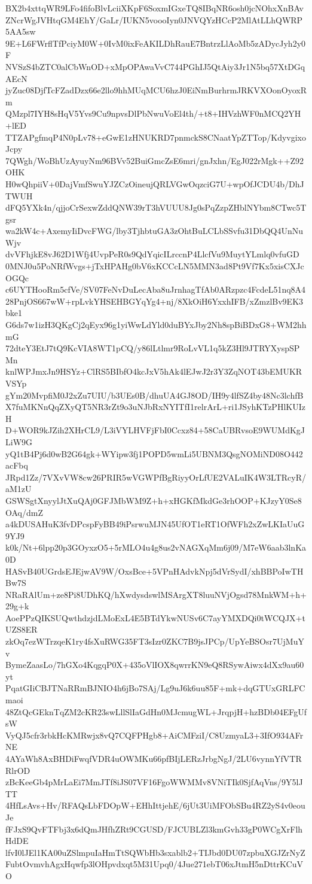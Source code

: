 BX2b4xttqWR9LFo4fifoBlvLciiXKpF6SoxmIGxeTQ8IBqNR6osh0jcNOhxXnBAv
ZNcrWgJVHtqGM4EhY/GaLr/IUKN5voooIyn0JNVQYzHCcP2MlAtLLhQWRP5AA5sw
9E+L6FWrflTfPciyM0W+0IvM0ixFeAKILDhRauE7BntrzLlAoMb5zADycJyh2y0F
NVSzS4bZTC0alCbWnOD+xMpOPAwaVvC744PGhIJ5QtAiy3Jr1N5bq57XtDGqAEcN
jyZuc08DjfTcFZadDzx66e2llo9hhMUqMCU6hzJ0EiNmBurhrmJRKVXOonOyoxRm
QMzpl7IYH8sHqV5Yvs9Cu9npvsDlPbNwuVoEl4th/+t8+IHVzhWF0nMCQ2YH+lED
TTZAPgfmqP4N0pLv78+eGwE1zHNUKRD7pnmckS8CNaatYpZTTop/KdyvgixoJcpy
7QWgh/WoBhUzAyuyNm96BVv52BuiGmcZsE6mri/gnJxhn/EgJ022rMgk++Z92OHK
H0wQhpiiV+0DajVmfSwuYJZCzOineujQRLVGwOqzciG7U+wpOfJCDU4b/DhJTWUH
dFQ5YXk4n/qjjoCrSexwZddQNW39rT3hVUUU8Jg0sPqZzpZHblNYbm8CTwc5Tgsr
wa2kW4c+AxemyIiDvcFWG/lby3TjhbtuGA3zOhtBuLCLbSSvfu31DbQQ4UnNuWjv
dvVFhjkE8vJ62D1Wfj4UvpPeR0s9QdYqicILrccnP4LlcfVu9MuytYLmlq0vfuGD
0MNJ0u5PoNRfWvgs+jTxHPAHg0bV6xKCCcLN5MMN3ad8Pt9Vf7Kx5xisCXJcOGQc
c6UYTHooRm5cfVe/SV07FeNvDuLecAba8uJrnhagTfAb0ARzpzc4FcdeL51nq8A4
28PnjOS667wW+rpLvkYHSEHBGYqYg4+nj/8XkOiH6YxxhIFB/xZmzlBv9EK3bke1
G6ds7w1izH3QKgCj2qEyx96g1yiWwLdYld0duBYxJby2Nh8spBiBDxG8+WM2hhmG
72dteY3EtJ7tQ9KcVIA8WT1pCQ/y86lLtlmr9RoLvVL1q5kZ3Hl9JTRYXyspSPMn
knlWPJmxJn9HSYz+ClRS5BIbfO4kcJxV5hAk4lEJwJ2r3Y3ZqNOT43bEMUKRVSYp
gYm20MvpfiM0J2xZu7UIU/b3UEs0B/dhuUA4GJ8OD/IH9y4lfSZ4by48Nc3lchfB
X7fuMKNnQqZXyQT5NR3rZt9o3uNJbRxNYITfI1relrArL+ri1JSyhKTzPHlKUIzH
D+WOR9kJZih2XHrCL9/L3iVYLHVFjFbI0Ccxz84+58CaUBRvsoE9WUMdKgJLiW9G
yQ1tB4Pj6d0wB2G64gk+WYipw3fj1POPD5wmLi5UBNM3QsgNOMiND08O442acFbq
JRpd1Zz/7VXvVW8cw26PRIR5wVGWPfBgRiyyOrLfUE2VALuIK4W3LTRcyR/aM1zU
GSWSgtXnyylJtXuQAj0GFJMbWM9Z+h+xHGKfMkdGe3rhOOP+KJzyY0Se8OAq/dmZ
a4kDUSAHuK3fvDPcspFyBB49iPsrwuMJN45UfOT1eRT1OfWFh2xZwLKIaUuG9YJ9
k0k/Nt+6lpp20p3GOyxzO5+5rMLO4u4g8us2vNAGXqMm6j09/M7eW6aab3lnKa0D
HASvB40UGrdsEJEjwAV9W/OxsBce+5VPnHAdvkNpj5dVrSydI/xhBBPoIwTHBw7S
NRaRAlUm+ze8Pi8UDhKQ/hXwdysdswlMSArgXT8luuNVjOgsd78MnkWM+h+29g+k
AoePPzQIKSUQwthdzjdLMoExL4E5BTdYkwNUSv6C7ayYMXDQi0tWCQJX+tUZS8ER
zkOq7ezWTrzqeK1ry4fsXuRWG35FT3sIzr0ZKC7B9jsJPCp/UpYeBSOsr7UjMuYv
BymeZaasLo/7hGXo4KqgqP0X+435oVlIOX8qwrrKN9eQ8RSywAiwx4dXx9au60yt
PqatGIiCBJTNaRRmBJNIO4h6jBo7SAj/Lg9uJ6k6uu85F+mk+dqGTUxGRLFCmaoi
48ZtQcGEknTqZM2cKR23swLllSlIaGdHn0MJcmugWL+JrqpjH+hzBDb04EFgUfsW
VyQJ5cfr3rbkHcKMRwjx8vQ7CQFPHgb8+AiCMFziI/C8UzmyaL3+3IfO934AFrNE
4AYaWh8AxBHDiFwqfVDR4uOWMKu66pfBIjLERzJrbgNgJ/2LU6vynnYfVTRRlrOD
zBcKeeGb4pMrLaEi7MmJTf8iJS07VF16FgoWWMMv8VNiTIk0SjfAqVns/9Y5lJTT
4HfLsAvs+Hv/RFAQsLbFDOpW+EHhIttjehE/6jUt3UiMFObSBu4RZ2yS4v0eouJe
fFJxS9QvFTFbj3x6dQmJHfhZRt9CGUSD/FJCUBLZl3kmGvh33gP0WCgXrFlhHdDE
lfvI0lJEl1KA00uZSlmpuIaHmTtSQWbHb3sxablb2+TIJbd0DU07zpbuXGJZrNyZ
FubtOvmvhAgxHqwfp3lOHpvdxqt5M31Upq0/4Jue271ebT06xJtmH5nDttrKCuVO

